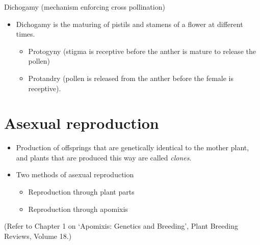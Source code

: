 \documentclass[11pt,ignorenonframetext,aspectratio=169]{beamer}
\providecommand{\tightlist}{%
  \setlength{\itemsep}{0pt}\setlength{\parskip}{0pt}}
\begin{document}
\begin{frame}{Dichogamy (mechanism enforcing cross pollination)}
\protect\hypertarget{dichogamy-mechanism-enforcing-cross-pollination}{}
\begin{itemize}
\tightlist
\item
  Dichogamy is the maturing of pistils and stamens of a flower at
  different times.

  \begin{itemize}
  \tightlist
  \item
    Protogyny (stigma is receptive before the anther is mature to
    release the pollen)
  \item
    Protandry (pollen is released from the anther before the female is
    receptive).
  \end{itemize}
\end{itemize}
\end{frame}

\hypertarget{asexual-reproduction}{%
\section{Asexual reproduction}\label{asexual-reproduction}}

\begin{frame}{}
\protect\hypertarget{section-17}{}
\begin{itemize}
\tightlist
\item
  Production of offsprings that are genetically identical to the mother
  plant, and plants that are produced this way are called \emph{clones}.
\item
  Two methods of asexual reproduction

  \begin{itemize}
  \tightlist
  \item
    Reproduction through plant parts
  \item
    Reproduction through apomixis
  \end{itemize}
\end{itemize}

(Refer to Chapter 1 on `Apomixis: Genetics and Breeding', Plant Breeding
Reviews, Volume 18.)
\end{frame}
\end{document}
